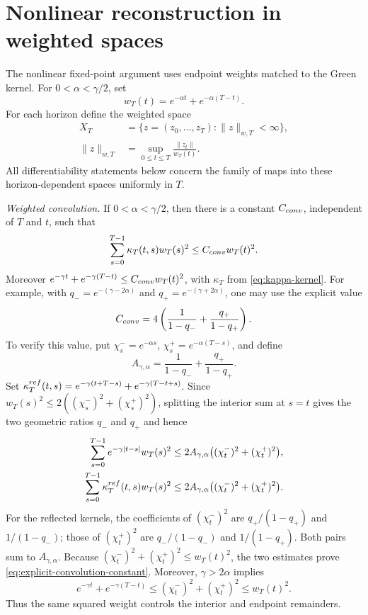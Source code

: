 \documentclass[twocolumn,nameyear,amsthm]{autart}
\numberwithin{equation}{section}
\begin{document}
\section{Nonlinear reconstruction in weighted spaces}\label{sec:reconstruction}

The nonlinear fixed-point argument uses endpoint weights matched to the Green kernel.  For $0<\alpha<\gamma/2$, set
\begin{equation}\label{eq:weight}
      w_T(t)=e^{-\alpha t}+e^{-\alpha(T-t)}.
\end{equation}
For each horizon define the weighted space
\[
\begin{aligned}
   X_T&=\{z=(z_0,\ldots,z_T):\|z\|_{w,T}<\infty\},\\
   \|z\|_{w,T}&=\sup_{0\le t\le T}\frac{\|z_t\|}{w_T(t)} .
\end{aligned}
\]
All differentiability statements below concern the family of maps into these horizon-dependent spaces uniformly in $T$.

\medskip\noindent\textit{Weighted convolution.}
If $0<\alpha<\gamma/2$, then there is a constant $C_{\rm conv}$, independent of $T$ and $t$, such that
\[
      \sum_{s=0}^{T-1}\kappa_T(t,s)w_T(s)^2
      \le C_{\rm conv}w_T(t)^2.
\]
Moreover $e^{-\gamma t}+e^{-\gamma(T-t)}\le C_{\rm conv}w_T(t)^2$, with $\kappa_T$ from \eqref{eq:kappa-kernel}.
For example, with $q_-=e^{-(\gamma-2\alpha)}$ and
$q_+=e^{-(\gamma+2\alpha)}$, one may use the explicit value
\begin{equation}\label{eq:explicit-convolution-constant}
 C_{\rm conv}=4\left(\frac1{1-q_-}+\frac{q_+}{1-q_+}\right).
\end{equation}
To verify this value, put $\chi_s^-=e^{-\alpha s}$,
$\chi_s^+=e^{-\alpha(T-s)}$, and define
\[
 A_{\gamma,\alpha}=\frac1{1-q_-}+\frac{q_+}{1-q_+}.
\]
Set
$\kappa_T^{\rm ref}(t,s)=e^{-\gamma(t+T-s)}+e^{-\gamma(T-t+s)}$.
Since $w_T(s)^2\le2((\chi_s^-)^2+(\chi_s^+)^2)$, splitting the interior
sum at $s=t$ gives the two geometric ratios $q_-$ and $q_+$ and hence
\begin{align}
 \sum_{s=0}^{T-1}e^{-\gamma|t-s|}w_T(s)^2
 &\le2A_{\gamma,\alpha}\bigl((\chi_t^-)^2+(\chi_t^+)^2\bigr),
 \label{eq:interior-weight-convolution}\\
 \sum_{s=0}^{T-1}\kappa_T^{\rm ref}(t,s)w_T(s)^2
 &\le2A_{\gamma,\alpha}\bigl((\chi_t^-)^2+(\chi_t^+)^2\bigr).
 \label{eq:reflected-weight-convolution}
\end{align}
For the reflected kernels, the coefficients of $(\chi_t^-)^2$ are
$q_+/(1-q_+)$ and $1/(1-q_-)$; those of $(\chi_t^+)^2$ are
$q_-/(1-q_-)$ and $1/(1-q_+)$.  Both pairs sum to
$A_{\gamma,\alpha}$.  Because
$(\chi_t^-)^2+(\chi_t^+)^2\le w_T(t)^2$, the two estimates prove
\eqref{eq:explicit-convolution-constant}.  Moreover, $\gamma>2\alpha$
implies
\[
 e^{-\gamma t}+e^{-\gamma(T-t)}
 \le(\chi_t^-)^2+(\chi_t^+)^2\le w_T(t)^2.
\]
Thus the same squared weight controls the interior and endpoint remainders.
\end{document}
